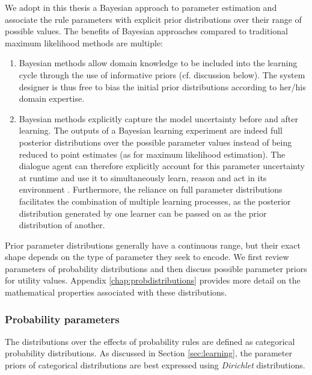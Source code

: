 We adopt in this thesis a Bayesian approach to parameter estimation and associate the rule parameters with explicit prior distributions over their range of possible values.  The benefits of Bayesian approaches compared to traditional maximum likelihood methods are multiple:
\begin{enumerate} 
\item Bayesian methods allow domain knowledge to be included into the learning cycle through the use of informative priors (cf. discussion below). The system designer is thus free to bias the initial prior distributions according to her/his domain expertise.
\item Bayesian methods explicitly capture the model uncertainty before and after learning.  The outputs of a Bayesian learning experiment are indeed full posterior distributions over the possible parameter values instead of being reduced to point estimates (as for maximum likelihood estimation).  The dialogue agent can therefore explicitly account for this parameter uncertainty at runtime and use it to simultaneously learn, reason and act in its environment \citep{Ross:2011}. Furthermore, the reliance on full parameter distributions facilitates the combination of multiple learning processes, as the posterior distribution generated by one learner can be passed on as the prior distribution of another. 
\end{enumerate}

Prior parameter distributions generally have a continuous range, but their exact shape depends on the type of parameter they seek to encode. We first review parameters of probability distributions and then discuss possible parameter priors for utility values.  Appendix \ref{chap:probdistributions} provides more detail on the mathematical properties associated with these distributions.

\subsubsection*{Probability parameters}

The distributions over the effects of probability rules are defined as categorical probability distributions.  As discussed in Section \ref{sec:learning}, the parameter priors of categorical distributions are best expressed using \textit{Dirichlet} distributions. 

